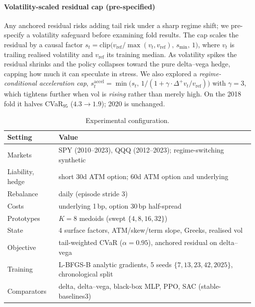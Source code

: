 \documentclass[sigconf,anonymous]{acmart}
\begin{document}
\paragraph{Volatility-scaled residual cap (pre-specified)} Any anchored residual
risks adding tail risk under a sharp regime shift; we pre-specify a volatility
safeguard before examining fold results. The cap scales the residual by a causal factor
$s_t = \mathrm{clip}\!\big(v_{\mathrm{ref}} / \max(v_t, v_{\mathrm{ref}}),\, s_{\min},\, 1\big)$,
where $v_t$ is trailing realised volatility and $v_{\mathrm{ref}}$ its training
median. As volatility spikes the residual shrinks and the policy collapses toward
the pure delta--vega hedge, capping how much it can speculate in stress. We also
explored a \emph{regime-conditional acceleration cap},
$s^{\mathrm{accel}}_t = \min\!\big(s_t,\, 1/(1 + \gamma \cdot \Delta^+\! v_t / v_{\mathrm{ref}})\big)$
with $\gamma=3$, which tightens further when vol is \emph{rising} rather than merely
high. On the 2018 fold it halves CVaR$_{95}$ ($4.3\!\to\!1.9$); 2020 is unchanged.

\begin{table}[t]
\centering
\caption{Experimental configuration.}
\label{tab:config}
\footnotesize
\begin{tabular}{@{}l p{}@{}}
\toprule
Setting & Value \\
\midrule
Markets & SPY (2010--2023), QQQ (2012--2023); regime-switching synthetic \\
Liability, hedge & short 30d ATM option; 60d ATM option and underlying \\
Rebalance & daily (episode stride 3) \\
Costs & underlying 1\,bp, option 30\,bp half-spread \\
Prototypes & $K=8$ medoids (swept $\{4,8,16,32\}$) \\
State & 4 surface factors, ATM/skew/term slope, Greeks, realised vol \\
Objective & tail-weighted CVaR ($\alpha=0.95$), anchored residual on delta--vega \\
Training & L-BFGS-B analytic gradients, 5 seeds $\{7,13,23,42,2025\}$, chronological split \\
Comparators & delta, delta--vega, black-box MLP, PPO, SAC (stable-baselines3) \\
\bottomrule
\end{tabular}
\end{table}
\end{document}
